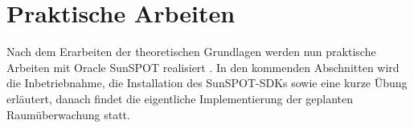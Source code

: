\chapter{Praktische Arbeiten}\label{c:PraktischeArbeiten}

Nach dem Erarbeiten der theoretischen Grundlagen werden nun praktische Arbeiten mit Oracle SunSPOT realisiert . In den kommenden Abschnitten wird die Inbetriebnahme, die Installation des SunSPOT-SDKs sowie eine kurze Übung erläutert, danach findet die eigentliche Implementierung der geplanten Raumüberwachung statt.  




